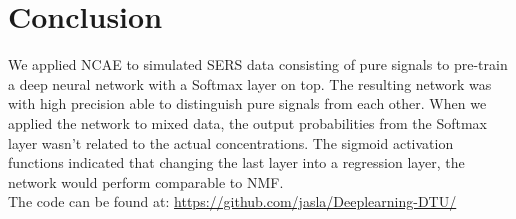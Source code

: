 \documentclass{article}
\begin{document}
\section{Conclusion}
\label{sec:conclusion}
We applied NCAE to simulated SERS data consisting of pure signals to pre-train a deep neural network with a Softmax layer on top. The resulting network was with high precision able to distinguish pure signals from each other. When we applied the network to mixed data, the output probabilities from the Softmax layer wasn't related to the actual concentrations. The sigmoid activation functions indicated that changing the last layer into a regression layer, the network would perform comparable to NMF.\\ The code can be found at:
\href{https://github.com/jasla/Deeplearning-DTU/}{https://github.com/jasla/Deeplearning-DTU/} 


\vfill
\pagebreak



%



\end{document}
